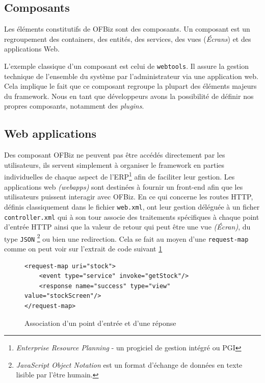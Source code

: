 \subsection{Composants}
Les éléments constitutifs de OFBiz sont des composants. Un composant est un regroupement des containers, des entités, des services, des vues (\emph{Écrans}) et des applications Web.


L'exemple classique d'un composant est celui de \verb|webtools|. Il assure la gestion technique de l'ensemble du système par l'administrateur via une application web. Cela implique le fait que ce composant regroupe la plupart des éléments majeurs du framework.
Nous en tant que développeurs avons la possibilité de définir nos propres composants, notamment des \emph{plugins}. 
  


\subsection{Web applications}
Des composant OFBiz ne peuvent pas être accédés directement par les utilisateurs, ils servent simplement à organiser le framework en parties individuelles de chaque aspect de l'ERP\footnote{  \emph{ Enterprise Resource Planning }- un progiciel de gestion intégré ou PGI} afin de faciliter leur gestion. Les applications web \emph{(webapps)} sont destinées à fournir un front-end afin que les utilisateurs puissent interagir avec OFBiz. En ce qui concerne les routes HTTP, définis classiquement dans le fichier \verb|web.xml|, ont leur gestion déléguée à un ficher \verb|controller.xml| qui à son tour associe des traitements spécifiques à chaque point d'entrée HTTP ainsi que la valeur de retour qui peut être une vue \emph{(Écran)}, du type \verb|JSON| \footnote{ \emph{JavaScript Object Notation} est un format d'échange de données en texte lisible par l'être humain. } ou bien une redirection. Cela se fait au moyen d'une \verb|request-map| comme on peut voir sur l'extrait de code suivant \ref{reqmap}



\lstset{language=XML}
\begin{figure}
\begin{lstlisting}[frame=leftline]
<request-map uri="stock">
    <event type="service" invoke="getStock"/>
    <response name="success" type="view" value="stockScreen"/>
</request-map>
\end{lstlisting}
	\caption{Association d'un point d'entrée et d'une réponse}
\label{reqmap}
\end{figure}



